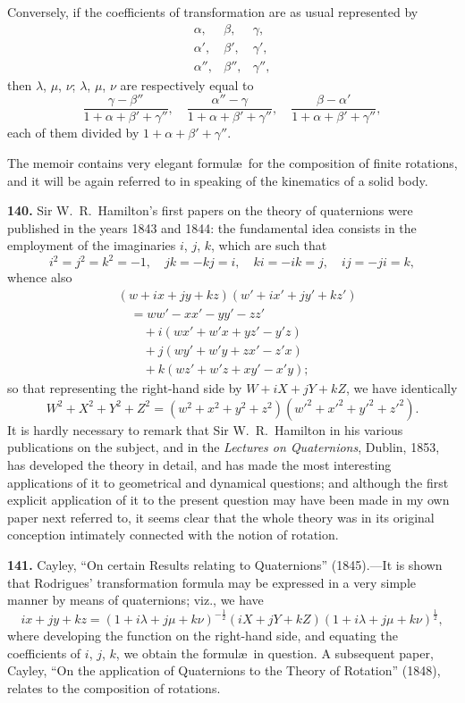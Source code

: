 \documentclass[11pt,a4paper]{article}
\theoremstyle{definition}
\begin{document}
Conversely, if the coefficients of transformation are as usual represented by
\[
\begin{array}{ccc}
\alpha, & \beta, & \gamma, \\
\alpha', & \beta', & \gamma', \\
\alpha'', & \beta'', & \gamma'',
\end{array}
\]
then $\lambda$, $\mu$, $\nu$; $\lambda$, $\mu$, $\nu$ are respectively equal to
\[
\frac{\gamma - \beta''}{1 + \alpha + \beta' + \gamma''}, \quad
\frac{\alpha'' - \gamma}{1 + \alpha + \beta' + \gamma''}, \quad
\frac{\beta - \alpha'}{1 + \alpha + \beta' + \gamma''},
\]
each of them divided by $1 + \alpha + \beta' + \gamma''$.

The memoir contains very elegant formul\ae\ for the composition of finite rotations, and it will be again referred to in speaking of the kinematics of a solid body.

\textbf{140.} Sir W.~R.~Hamilton's first papers on the theory of quaternions were published in the years 1843 and 1844: the fundamental idea consists in the employment of the imaginaries $i$, $j$, $k$, which are such that
\[
i^2 = j^2 = k^2 = -1, \quad jk = -kj = i, \quad ki = -ik = j, \quad ij = -ji = k,
\]
whence also
\begin{align*}
&(w + ix + jy + kz)(w' + ix' + jy' + kz') \\
&\quad = ww' - xx' - yy' - zz' \\
&\qquad + i(wx' + w'x + yz' - y'z) \\
&\qquad + j(wy' + w'y + zx' - z'x) \\
&\qquad + k(wz' + w'z + xy' - x'y);
\end{align*}
so that representing the right-hand side by $W + iX + jY + kZ$, we have identically
\[
W^2 + X^2 + Y^2 + Z^2 = (w^2 + x^2 + y^2 + z^2)(w'^2 + x'^2 + y'^2 + z'^2).
\]
It is hardly necessary to remark that Sir W.~R.~Hamilton in his various publications on the subject, and in the \textit{Lectures on Quaternions}, Dublin, 1853, has developed the theory in detail, and has made the most interesting applications of it to geometrical and dynamical questions; and although the first explicit application of it to the present question may have been made in my own paper next referred to, it seems clear that the whole theory was in its original conception intimately connected with the notion of rotation.

\textbf{141.} Cayley, ``On certain Results relating to Quaternions'' (1845).---It is shown that Rodrigues' transformation formula may be expressed in a very simple manner by means of quaternions; viz., we have
\[
ix + jy + kz = (1 + i\lambda + j\mu + k\nu)^{-\frac{1}{2}}(iX + jY + kZ)(1 + i\lambda + j\mu + k\nu)^{\frac{1}{2}},
\]
where developing the function on the right-hand side, and equating the coefficients of $i$, $j$, $k$, we obtain the formul\ae\ in question. A subsequent paper, Cayley, ``On the application of Quaternions to the Theory of Rotation'' (1848), relates to the composition of rotations.
\end{document}
